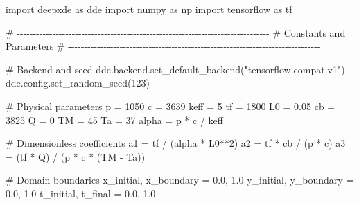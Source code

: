\documentclass[
  spanish,
  us-letterpaper,
  DIV=11,
  numbers=noendperiod]{scrreprt}
\newenvironment{Shaded}{\begin{snugshade}}{\end{snugshade}}
\newcommand{\CommentTok}[1]{\textcolor[rgb]{0.37,0.37,0.37}{#1}}
\newcommand{\DecValTok}[1]{\textcolor[rgb]{0.68,0.00,0.00}{#1}}
\newcommand{\FloatTok}[1]{\textcolor[rgb]{0.68,0.00,0.00}{#1}}
\newcommand{\ImportTok}[1]{\textcolor[rgb]{0.00,0.46,0.62}{#1}}
\newcommand{\NormalTok}[1]{\textcolor[rgb]{0.00,0.23,0.31}{#1}}
\newcommand{\OperatorTok}[1]{\textcolor[rgb]{0.37,0.37,0.37}{#1}}
\newcommand{\StringTok}[1]{\textcolor[rgb]{0.13,0.47,0.30}{#1}}
\theoremstyle{plain}
\theoremstyle{definition}
\theoremstyle{remark}
\begin{document}
\begin{Shaded}
\begin{Highlighting}[]
\ImportTok{import}\NormalTok{ deepxde }\ImportTok{as}\NormalTok{ dde}
\ImportTok{import}\NormalTok{ numpy }\ImportTok{as}\NormalTok{ np}
\ImportTok{import}\NormalTok{ tensorflow }\ImportTok{as}\NormalTok{ tf}

\CommentTok{\# {-}{-}{-}{-}{-}{-}{-}{-}{-}{-}{-}{-}{-}{-}{-}{-}{-}{-}{-}{-}{-}{-}{-}{-}{-}{-}{-}{-}{-}{-}{-}{-}{-}{-}{-}{-}{-}{-}{-}{-}{-}{-}{-}{-}{-}{-}{-}{-}{-}{-}{-}{-}{-}{-}{-}{-}{-}{-}{-}{-}{-}{-}{-}{-}{-}{-}{-}{-}{-}{-}{-}{-}{-}{-}{-}{-}{-}{-}}
\CommentTok{\# Constants and Parameters}
\CommentTok{\# {-}{-}{-}{-}{-}{-}{-}{-}{-}{-}{-}{-}{-}{-}{-}{-}{-}{-}{-}{-}{-}{-}{-}{-}{-}{-}{-}{-}{-}{-}{-}{-}{-}{-}{-}{-}{-}{-}{-}{-}{-}{-}{-}{-}{-}{-}{-}{-}{-}{-}{-}{-}{-}{-}{-}{-}{-}{-}{-}{-}{-}{-}{-}{-}{-}{-}{-}{-}{-}{-}{-}{-}{-}{-}{-}{-}{-}{-}}

\CommentTok{\# Backend and seed}
\NormalTok{dde.backend.set\_default\_backend(}\StringTok{"tensorflow.compat.v1"}\NormalTok{)}
\NormalTok{dde.config.set\_random\_seed(}\DecValTok{123}\NormalTok{)}

\CommentTok{\# Physical parameters}
\NormalTok{p }\OperatorTok{=} \DecValTok{1050}
\NormalTok{c }\OperatorTok{=} \DecValTok{3639}
\NormalTok{keff }\OperatorTok{=} \DecValTok{5}
\NormalTok{tf }\OperatorTok{=} \DecValTok{1800}
\NormalTok{L0 }\OperatorTok{=} \FloatTok{0.05}
\NormalTok{cb }\OperatorTok{=} \DecValTok{3825}
\NormalTok{Q }\OperatorTok{=} \DecValTok{0}
\NormalTok{TM }\OperatorTok{=} \DecValTok{45}
\NormalTok{Ta }\OperatorTok{=} \DecValTok{37}
\NormalTok{alpha }\OperatorTok{=}\NormalTok{ p }\OperatorTok{*}\NormalTok{ c }\OperatorTok{/}\NormalTok{ keff}

\CommentTok{\# Dimensionless coefficients}
\NormalTok{a1 }\OperatorTok{=}\NormalTok{ tf }\OperatorTok{/}\NormalTok{ (alpha }\OperatorTok{*}\NormalTok{ L0}\OperatorTok{**}\DecValTok{2}\NormalTok{)}
\NormalTok{a2 }\OperatorTok{=}\NormalTok{ tf }\OperatorTok{*}\NormalTok{ cb }\OperatorTok{/}\NormalTok{ (p }\OperatorTok{*}\NormalTok{ c)}
\NormalTok{a3 }\OperatorTok{=}\NormalTok{ (tf }\OperatorTok{*}\NormalTok{ Q) }\OperatorTok{/}\NormalTok{ (p }\OperatorTok{*}\NormalTok{ c }\OperatorTok{*}\NormalTok{ (TM }\OperatorTok{{-}}\NormalTok{ Ta))}

\CommentTok{\# Domain boundaries}
\NormalTok{x\_initial, x\_boundary }\OperatorTok{=} \FloatTok{0.0}\NormalTok{, }\FloatTok{1.0}
\NormalTok{y\_initial, y\_boundary }\OperatorTok{=} \FloatTok{0.0}\NormalTok{, }\FloatTok{1.0}
\NormalTok{t\_initial, t\_final }\OperatorTok{=} \FloatTok{0.0}\NormalTok{, }\FloatTok{1.0}


\end{Highlighting}
\end{Shaded}
\end{document}
